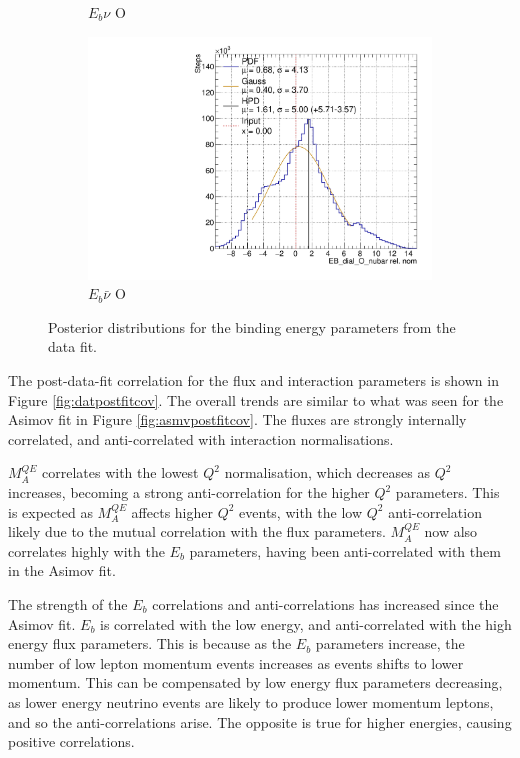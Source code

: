 \begin{figure}
\begin{subfigure}{.48\textwidth}
  \caption{$E_{b}\nu$ O}
\end{subfigure}
\begin{subfigure}{.48\textwidth}
  \centering
  \includegraphics[width=0.73\linewidth]{figs/EB_dial_O_nubarData}
  \caption{$E_{b}\bar{\nu}$ O}
\end{subfigure}
\caption{Posterior distributions for the binding energy parameters from the data fit.}
\label{fig:Ebdatares}
\end{figure}

The post-data-fit correlation for the flux and interaction parameters is shown in Figure \ref{fig:datpostfitcov}. The overall trends are similar to what was seen for the Asimov fit in Figure \ref{fig:asmvpostfitcov}. The fluxes are strongly internally correlated, and anti-correlated with interaction normalisations. 

$M^{QE}_A$ correlates with the lowest $Q^2$ normalisation, which decreases as $Q^2$ increases, becoming a strong anti-correlation for the higher $Q^2$ parameters. This is expected as $M^{QE}_A$ affects higher $Q^2$ events, with the low $Q^2$ anti-correlation likely due to the mutual correlation with the flux parameters. $M^{QE}_A$ now also correlates highly with the $E_b$ parameters, having been anti-correlated with them in the Asimov fit.

The strength of the $E_b$ correlations and anti-correlations has increased since the Asimov fit. $E_b$ is correlated with the low energy, and anti-correlated with the high energy flux parameters. This is because as the $E_b$ parameters increase, the number of low lepton momentum events increases as events shifts to lower momentum. This can be compensated by low energy flux parameters decreasing, as lower energy neutrino events are likely to produce lower momentum leptons, and so the anti-correlations arise. The opposite is true for higher energies, causing positive correlations.

